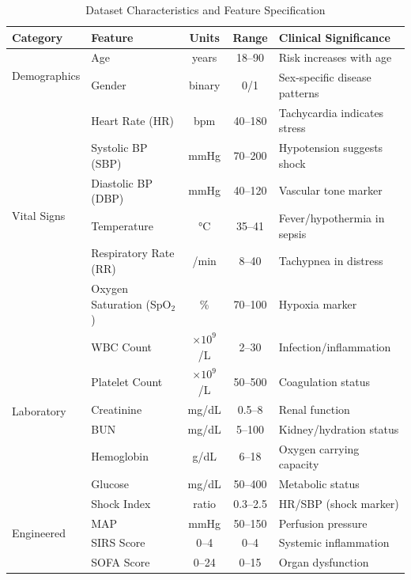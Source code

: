 \documentclass[conference]{IEEEtran}
\begin{document}
\begin{table}[!t]
\caption{Dataset Characteristics and Feature Specification}
\label{tab:dataset}
\centering
\footnotesize
\begin{tabular}{llccl}
\toprule
\textbf{Category} & \textbf{Feature} & \textbf{Units} & \textbf{Range} & \textbf{Clinical Significance} \\
\midrule
\multirow{2}{*}{Demographics} 
& Age & years & 18--90 & Risk increases with age \\
& Gender & binary & 0/1 & Sex-specific disease patterns \\
\midrule
\multirow{6}{*}{Vital Signs} 
& Heart Rate (HR) & bpm & 40--180 & Tachycardia indicates stress \\
& Systolic BP (SBP) & mmHg & 70--200 & Hypotension suggests shock \\
& Diastolic BP (DBP) & mmHg & 40--120 & Vascular tone marker \\
& Temperature & °C & 35--41 & Fever/hypothermia in sepsis \\
& Respiratory Rate (RR) & /min & 8--40 & Tachypnea in distress \\
& Oxygen Saturation (SpO$_2$) & \% & 70--100 & Hypoxia marker \\
\midrule
\multirow{6}{*}{Laboratory} 
& WBC Count & $\times10^9$/L & 2--30 & Infection/inflammation \\
& Platelet Count & $\times10^9$/L & 50--500 & Coagulation status \\
& Creatinine & mg/dL & 0.5--8 & Renal function \\
& BUN & mg/dL & 5--100 & Kidney/hydration status \\
& Hemoglobin & g/dL & 6--18 & Oxygen carrying capacity \\
& Glucose & mg/dL & 50--400 & Metabolic status \\
\midrule
\multirow{4}{*}{Engineered} 
& Shock Index & ratio & 0.3--2.5 & HR/SBP (shock marker) \\
& MAP & mmHg & 50--150 & Perfusion pressure \\
& SIRS Score & 0--4 & 0--4 & Systemic inflammation \\
& SOFA Score & 0--24 & 0--15 & Organ dysfunction \\
\bottomrule
\end{tabular}
\end{table}
\end{document}
